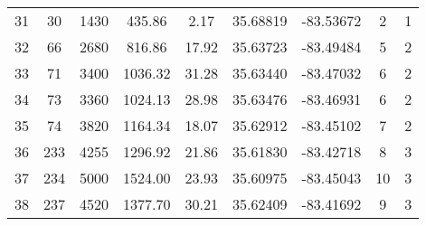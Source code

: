\begin{table}[p]
\begin{flushleft}
\begin{tabular}{ccccccccc}
31 & 30                                                   & 1430                                                          & 435.86                                                       & 2.17   & 35.68819 & -83.53672 & 2                                                                                      & 1 \\ 
32 & 66                                                   & 2680                                                          & 816.86                                                       & 17.92 & 35.63723 & -83.49484 & 5                                                                                      & 2 \\ 
33 & 71                                                   & 3400                                                          & 1036.32                                                     & 31.28 & 35.63440 & -83.47032 & 6                                                                                      & 2 \\ 
34 & 73                                                   & 3360                                                          & 1024.13                                                     & 28.98 & 35.63476 & -83.46931 & 6                                                                                      & 2 \\ 
35 & 74                                                   & 3820                                                          & 1164.34                                                     & 18.07 & 35.62912 & -83.45102 & 7                                                                                      & 2 \\ 
36 & 233                                                 & 4255                                                          & 1296.92                                                     & 21.86 & 35.61830 & -83.42718 & 8                                                                                      & 3 \\ 
37 & 234                                                 & 5000                                                          & 1524.00                                                     & 23.93 & 35.60975 & -83.45043 & 10                                                                                    & 3 \\ 
38 & 237                                                 & 4520                                                          & 1377.70                                                     & 30.21 & 35.62409 & -83.41692 & 9                                                                                      & 3 \\ 

\end{tabular}
\end{flushleft}
\end{table}
